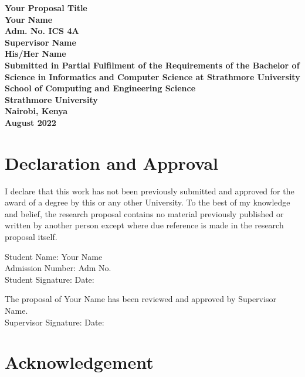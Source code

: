 \documentclass[12pt, a4paper]{article}
\begin{document}
\begin{center}
    \textbf{Your Proposal Title\\
    \vspace{70pt}
    Your Name\\
    Adm. No.
    ICS 4A\\
    \vspace{70pt}
    Supervisor Name\\
    His/Her Name\\
    \vspace{70pt}
    Submitted in Partial Fulfilment of the Requirements of the Bachelor of Science in Informatics and Computer Science at Strathmore University\\
    \vspace{70pt}
    School of Computing and Engineering Science\\
    Strathmore University\\
    Nairobi, Kenya\\
    \vspace{50pt}
    August 2022
    }
\end{center}

\thispagestyle{empty}
\clearpage
{}
\section*{Declaration and Approval}
I declare that this work has not been previously submitted and approved for the award of a
degree by this or any other University. To the best of my knowledge and belief, the research
proposal contains no material previously published or written by another person except where
due reference is made in the research proposal itself.

\vspace{3cm}
Student Name: Your Name\\
Admission Number: Adm No.\\
Student Signature: \underline{\hspace{4cm}} Date: \underline{\hspace{4cm}}

\vspace{3cm}
The proposal of Your Name has been reviewed and approved by Supervisor Name.\\
Supervisor Signature: \underline{\hspace{4cm}} Date: \underline{\hspace{4cm}}
\clearpage
\section*{Acknowledgement}
\blindtext
\clearpage
\end{document}
